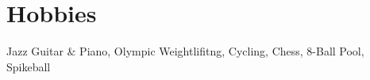 \documentclass[letterpaper,11pt]{article}
\makeatletter
\newcommand{\resumeItem}[1]{
  \item\small{
    {#1 \vspace{-2pt}}
  }
}
\newcommand{\resumeProjectHeading}[2]{
    \vspace{-2pt}\item
    \begin{tabular*}{0.97\textwidth}{l@{\extracolsep{\fill}}r}
      \small#1 & #2 \\
    \end{tabular*}\vspace{-7pt}
}
\newcommand{\resumeSubHeadingListStart}{\begin{itemize}[leftmargin=0.15in, label={}]}
\newcommand{\resumeSubHeadingListEnd}{\end{itemize}}
\newcommand{\resumeItemListStart}{\begin{itemize}}
\newcommand{\resumeItemListEnd}{\end{itemize}\vspace{-5pt}}
\makeatother
\begin{document}

      
      
      
      






\section{Hobbies}
  \resumeSubHeadingListStart
  \small{\item{Jazz Guitar \& Piano, Olympic Weightlifitng, Cycling, Chess, 8-Ball Pool, Spikeball}}
  \resumeSubHeadingListEnd
\end{document}
